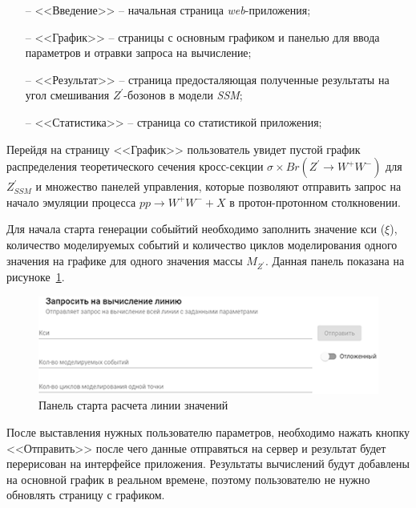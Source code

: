 \begin{enumerate}
	\item[--] <<Введение>> -- начальная страница \textit{web}-приложения;
	\item[--] <<График>> -- страницы с основным графиком и панелью для ввода параметров и отравки запроса на вычисление;
	\item[--] <<Результат>> -- страница предосталяющая полученные результаты на угол смешивания ${Z}^{\prime}$-бозонов в модели \textit{SSM};
	\item[--] <<Статистика>> -- страница со статистикой приложения;
\end{enumerate}

Перейдя на страницу <<График>> пользователь увидет пустой график распределения теоретического сечения кросс-секции $\sigma \times Br({Z}^{\prime} \rightarrow {W}^{+}{W}^{-})$ для ${Z}^{\prime}_{SSM}$ и множество панелей управления, которые позволяют отправить запрос на начало эмуляции процесса $pp \rightarrow {W}^{+}{W}^{-} + X$ в протон-протонном столкновении. 

Для начала старта генерации собыйтий необходимо заполнить значение кси ($\xi$), количество моделируемых событий и количество циклов моделирования одного значения на графике для одного значения массы ${M}_{{Z}^{\prime}}$. Данная панель показана на рисуноке~\ref{fig:request-line}.


\vspace{16pt}
\begin{figure}[!h]
	\centering
	\includegraphics[width=\textwidth]{figures/request-line.png}
	\caption{Панель старта расчета линии значений}
	\label{fig:request-line}
\end{figure}

После выставления нужных пользователю параметров, необходимо нажать кнопку <<Отправить>> после чего данные отправяться на сервер и результат будет перерисован на интерфейсе приложения. Результаты вычислений будут добавлены на основной график в реальном времене, поэтому пользователю не нужно обновлять страницу с графиком.

